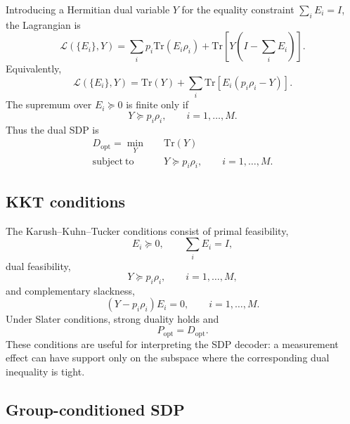 \documentclass[
 reprint,
 amsmath,amssymb,
 aps,
 pra,
 floatfix,
]{revtex4-2}
\begin{document}
Introducing a Hermitian dual variable $Y$ for the equality constraint $\sum_i E_i=I$, the Lagrangian is
\begin{equation}
    \mathcal{L}(\{E_i\},Y)
    =
    \sum_i p_i\mathrm{Tr}(E_i\rho_i)
    +
    \mathrm{Tr}\left[
    Y\left(I-\sum_iE_i\right)
    \right].
\end{equation}
Equivalently,
\begin{equation}
    \mathcal{L}(\{E_i\},Y)
    =
    \mathrm{Tr}(Y)
    +
    \sum_i
    \mathrm{Tr}\left[
    E_i(p_i\rho_i-Y)
    \right].
\end{equation}
The supremum over $E_i\succeq0$ is finite only if
\begin{equation}
    Y\succeq p_i\rho_i,\qquad i=1,\ldots,M.
\end{equation}
Thus the dual SDP is
\begin{align}
    D_{\mathrm{opt}}
    =
    \min_Y\quad
    &\mathrm{Tr}(Y)
    \label{eq:appendix_dual_sdp}\\
    \mathrm{subject\ to}\quad
    &Y\succeq p_i\rho_i,\qquad i=1,\ldots,M.\nonumber
\end{align}

\subsection{KKT conditions}

The Karush--Kuhn--Tucker conditions consist of primal feasibility,
\begin{equation}
    E_i\succeq0,\qquad \sum_iE_i=I,
\end{equation}
dual feasibility,
\begin{equation}
    Y\succeq p_i\rho_i,\qquad i=1,\ldots,M,
\end{equation}
and complementary slackness,
\begin{equation}
    (Y-p_i\rho_i)E_i=0,\qquad i=1,\ldots,M.
\end{equation}
Under Slater conditions, strong duality holds and
\begin{equation}
    P_{\mathrm{opt}}=D_{\mathrm{opt}}.
\end{equation}
These conditions are useful for interpreting the SDP decoder: a measurement effect can have support only on the subspace where the corresponding dual inequality is tight.

\subsection{Group-conditioned SDP}
\end{document}

